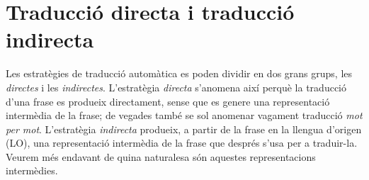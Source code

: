 

\section{Traducció directa i traducció indirecta} 
Les estratègies de traducció automàtica es poden dividir en dos grans
grups, les \emph{directes} i les \emph{indirectes}. L'estratègia
\emph{directa} s'anomena així perquè la traducció d'una frase es
produeix directament, sense que es genere una representació intermèdia
de la frase; de vegades també se sol anomenar vagament traducció
\emph{mot per mot}. L'estratègia \emph{indirecta} produeix, a partir
de la frase en la llengua d'origen (LO), una representació intermèdia
de la frase que després s'usa per a traduir-la. Veurem més endavant de
quina naturalesa són aquestes representacions intermèdies.

